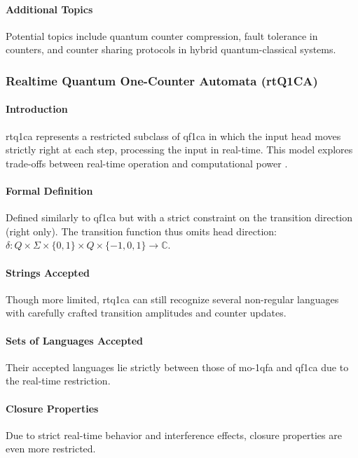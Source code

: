 \paragraph{Additional Topics}
Potential topics include quantum counter compression, fault tolerance in counters, and counter sharing protocols in hybrid quantum-classical systems.

\subsubsection{Realtime Quantum One-Counter Automata (rtQ1CA)}

\paragraph{Introduction}
\gls{rtq1ca} represents a restricted subclass of \gls{qf1ca} in which the input head moves strictly right at each step, processing the input in real-time. This model explores trade-offs between real-time operation and computational power \cite{cem2012quantum}.

\paragraph{Formal Definition}
Defined similarly to \gls{qf1ca} but with a strict constraint on the transition direction (right only). The transition function thus omits head direction: $\delta: Q \times \Sigma \times \{0,1\} \times Q \times \{-1,0,1\} \rightarrow \mathbb{C}$.

\paragraph{Strings Accepted}
Though more limited, \gls{rtq1ca} can still recognize several non-regular languages with carefully crafted transition amplitudes and counter updates.

\paragraph{Sets of Languages Accepted}
Their accepted languages lie strictly between those of \gls{mo-1qfa} and \gls{qf1ca} due to the real-time restriction.

\paragraph{Closure Properties}
Due to strict real-time behavior and interference effects, closure properties are even more restricted.

